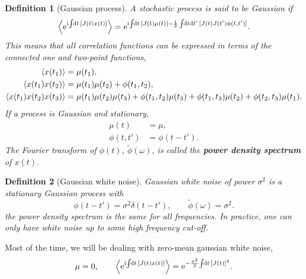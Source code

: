 \documentclass[12pt]{article}
\theoremstyle{slplain}
\theoremstyle{sldefinition}
\newtheorem{defn}{Definition}
\theoremstyle{remark}
\begin{document}
\begin{defn}[Gaussian process]
  A stochastic process is said to be Gaussian if
  \begin{equation}\label{eq:gaussproc}
    \av{\e^{\ir\!\intd{t} [J(t) x(t)]}} = \e^{\ir\!\intd{t} [J(t)\mu(t)] - \frac{1}{2}\intd{t\dr t'} [J(t)J(t')\phi(t,t')]}.
  \end{equation}
  This means that all correlation functions can be expressed in terms of the connected one and two-point functions, \eg
  \begin{equation}\label{eq:gaussmom}
    \begin{aligned}
      \left\langle x(t_1) \right\rangle &= \mu(t_1), \\
      \left\langle x(t_1)x(t_2) \right\rangle  &= \mu(t_1)\mu(t_2) + \phi(t_1,t_2), \\
      \left\langle x(t_1)x(t_2)x(t_3) \right\rangle  &= \mu(t_1)\mu(t_2)\mu(t_3) + \phi(t_1,t_2)\mu(t_3) + \phi(t_1,t_3)\mu(t_2) + \phi(t_2,t_3)\mu(t_1).
    \end{aligned}
  \end{equation}
  If a process is Gaussian and stationary,
  \begin{equation}\label{eq:statgauss}
    \begin{aligned}
      \mu(t) &= \mu, \\
      \phi(t,t')  &= \phi(t-t').
    \end{aligned}
  \end{equation}
  The Fourier transform of $\phi(t)$, $\tilde{\phi}(\omega)$, is called the \textbf{power density spectrum} of $x(t)$.
\end{defn}

\begin{defn}[Gaussian white noise]
  Gaussian white noise of power $\sigma^2$ is a stationary Gaussian process with
  \begin{equation}\label{eq:gaussianwhite}
    \phi(t-t') = \sigma^2\delta(t-t'), \qquad
    \tilde{\phi}(\omega) = \sigma^2.
  \end{equation}
  \ie the power density spectrum is the same for all frequencies. In practice, one can only have white noise up to some high frequency cut-off.
\end{defn}

Most of the time, we will be dealing with zero-mean gaussian white noise, \ie
%
\begin{equation}\label{eq:zeromeanwhite}
  \mu=0, \qquad
  \av{\e^{\ir\!\intd{t} [J(t) x(t)]}} = \e^{-\frac{\sigma^2}{2}\!\intd{t} [J(t)]^2}.
\end{equation}
%
\end{document}
